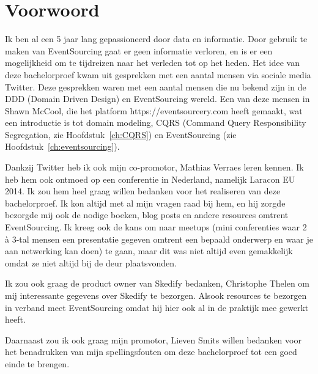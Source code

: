 
\chapter*{Voorwoord}
\label{ch:voorwoord}


Ik ben al een 5 jaar lang gepassioneerd door data en informatie. Door gebruik te maken van EventSourcing gaat er geen informatie verloren, en is er een mogelijkheid om te tijdreizen naar het verleden tot op het heden. Het idee van deze bachelorproef kwam uit gesprekken met een aantal mensen via sociale media Twitter. Deze gesprekken waren met een aantal mensen die nu bekend zijn in de DDD (Domain Driven Design) en EventSourcing wereld. Een van deze mensen in Shawn McCool, die het platform https://eventsourcery.com heeft gemaakt, wat een introductie is tot domain modeling, CQRS (Command Query Responsibility Segregation, zie Hoofdstuk~\ref{ch:CQRS}) en EventSourcing (zie Hoofdstuk~\ref{ch:eventsourcing}).

Dankzij Twitter heb ik ook mijn co-promotor, Mathias Verraes leren kennen. Ik heb hem ook ontmoed op een conferentie in Nederland, namelijk Laracon EU 2014. Ik zou hem heel graag willen bedanken voor het realiseren van deze bachelorproef. Ik kon altijd met al mijn vragen raad bij hem, en hij zorgde bezorgde mij ook de nodige boeken, blog posts en andere resources omtrent EventSourcing. Ik kreeg ook de kans om naar meetups (mini conferenties waar 2 à 3-tal mensen een presentatie gegeven omtrent een bepaald onderwerp en waar je aan netwerking kan doen) te gaan, maar dit was niet altijd even gemakkelijk omdat ze niet altijd bij de deur plaatsvonden.

Ik zou ook graag de product owner van Skedify bedanken, Christophe Thelen om mij interessante gegevens over Skedify te bezorgen. Alsook resources te bezorgen in verband meet EventSourcing omdat hij hier ook al in de praktijk mee gewerkt heeft.

Daarnaast zou ik ook graag mijn promotor, Lieven Smits willen bedanken voor het benadrukken van mijn spellingsfouten om deze bachelorproef tot een goed einde te brengen.